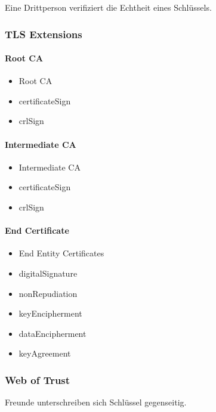 Eine Drittperson verifiziert die Echtheit eines Schlüssels.

\subsubsection{TLS Extensions}

\paragraph{Root CA}
\begin{itemize}
	\item	Root CA
	\item	certificateSign
	\item	crlSign
\end{itemize}

\paragraph{Intermediate CA}
\begin{itemize}
	\item	Intermediate CA
	\item	certificateSign
	\item	crlSign
\end{itemize}

\paragraph{End Certificate}
\begin{itemize}
	\item	End Entity Certificates
	\item	digitalSignature
	\item	nonRepudiation
	\item	keyEncipherment
	\item	dataEncipherment
	\item	keyAgreement
\end{itemize}

\subsubsection{Web of Trust}

Freunde unterschreiben sich Schlüssel gegenseitig.

